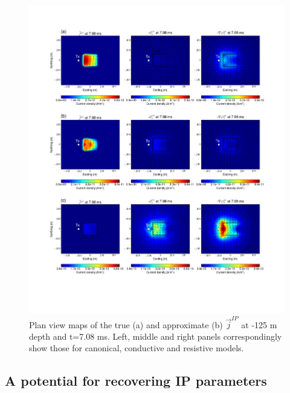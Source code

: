 \documentclass[a4paper, 11pt]{article}
\renewcommand {\j}  { {\vec j} }
\begin{document}
\begin{figure}[htb]
  \centering  \includegraphics[width=1.0\textwidth]{figures/threecasesresp/jpolvsj1IP_ch38.png}
  \caption{Plan view maps of the true (a) and approximate (b) $\j^{IP}$ at -125 m depth and t=7.08 ms. Left, middle and right panels correspondingly show those for canonical, conductive and resistive models.}
  \label{F:jpolvsj1IP}
\end{figure}
\clearpage

\subsection{A potential for recovering IP parameters}
\end{document}
